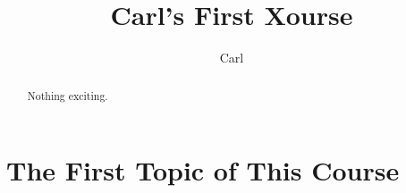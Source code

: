 \documentclass{xourse}
\author{Carl}
\title{Carl's First Xourse}
\begin{document}
\begin{abstract}
    Nothing exciting.
\end{abstract}
\maketitle
\part{The First Topic of This Course}
\chapterstyle
{}
\end{document}
